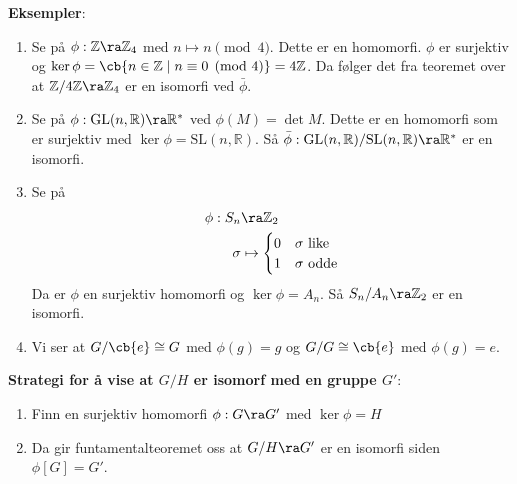 \textbf{Eksempler}:
\begin{enumerate}
	\item Se på $\phi: \mathbb{Z}\ra \mathbb{Z}_4$ med $n\mapsto n\pmod{4}$. Dette er en homomorfi.
	      $\phi$ er surjektiv og $\ker\phi=\cb{n\in \mathbb{Z}\mid n \equiv 0 \pmod{4}}=4 \mathbb{Z}$.
	      Da følger det fra teoremet over at $\mathbb{Z}/4 \mathbb{Z} \ra \mathbb{Z}_4$ er en isomorfi
	      ved $\bar\phi$.
	\item Se på $\phi: \text{GL}(n, \mathbb{R})\ra \mathbb{R}^*$ ved $\phi(M)=\det M$. Dette er en
	      homomorfi som er surjektiv med $\ker\phi=\text{SL}(n, \mathbb{R})$. Så
	      $\bar\phi: \text{GL}(n, \mathbb{R})/\text{SL}(n, \mathbb{R})\ra \mathbb{R}^*$ er en
	      isomorfi.
	\item Se på
	      \begin{align}
		      \phi:S_n & \ra \mathbb{Z}_2                                                                \\
		      \sigma   & \mapsto \begin{cases}0 & \sigma\text{ like}\\1 & \sigma \text{ odde}\end{cases}
	      \end{align}
	      Da er $\phi$ en surjektiv homomorfi og $\ker\phi=A_n$. Så $S_n/A_n\ra \mathbb{Z}_2$ er
	      en isomorfi.
	\item Vi ser at $G/\cb{e}\cong G$ med $\phi(g)=g$ og $G/G\cong \cb{e}$ med $\phi(g)=e$.
\end{enumerate}

\textbf{Strategi for å vise at $G/H$ er isomorf med en gruppe $G'$}:
\begin{enumerate}
	\item Finn en surjektiv homomorfi $\phi: G\ra G'$ med $\ker\phi=H$
	\item Da gir funtamentalteoremet oss at $G/H\ra G'$ er en isomorfi siden $\phi[G]=G'$.
\end{enumerate}

